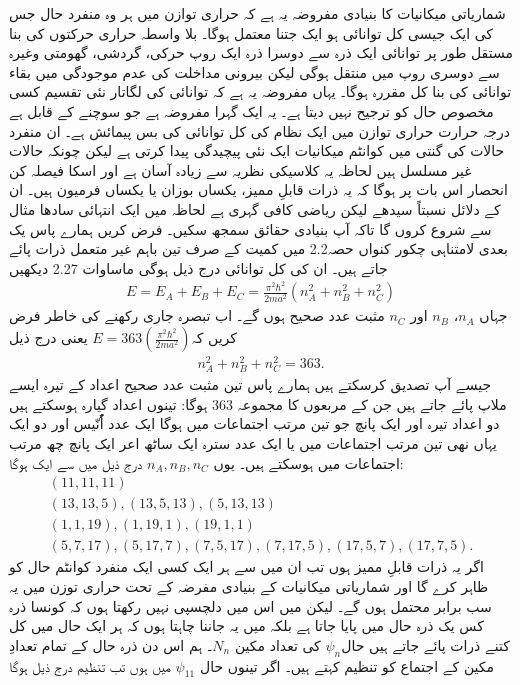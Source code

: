 شماریاتی میکانیات کا بنیادی مفروضہ یہ ہے کہ حراری توازن میں ہر وہ منفرد حال جس کی ایک جیسی کل توانائی  ہو ایک جتنا معتمل ہوگا۔ بلا واسطہ حراری حرکتوں کی بنا مستقل طور پر توانائی ایک ذرہ سے دوسرا ذرہ ایک روپ حرکی، گردشی، گھومتی وغیرہ سے دوسری روپ میں منتقل ہوگی لیکن بیرونی مداخلت کی عدم موجودگی میں بقاء توانائی کی بنا کل مقررہ ہوگا۔ یہاں مفروضہ یہ ہے  کہ توانائی کی لگاتار نئی تقسیم کسی مخصوص حال کو ترجیح نہیں دیتا ہے۔ یہ ایک گہرا مفروضہ ہے جو سوچنے کے قابل ہے درجہ حرارت  حراری توازن میں ایک نظام کی کل توانائی کی بس پیمائش ہے۔ ان منفرد حالات کی گنتی میں کوانٹم میکانیات ایک نئی پیچیدگی پیدا کرتی ہے لیکن چونکہ حالات غیر مسلسل ہیں لحاظہ یہ کلاسیکی نظریہ سے زیادہ آسان ہے اور اسکا فیصلہ کن انحصار اس بات پر ہوگا کہ یہ ذرات قابلِ ممیز، یکساں بوزان یا یکساں فرمیون ہیں۔ ان کے دلائل نسبتاً سیدھے لیکن ریاضی کافی گہری ہے لحاظہ میں ایک انتہائی سادھا مثال سے شروع کروں گا تاکہ آپ بنیادی حقائق سمجھ سکیں۔
فرض کریں ہمارے پاس یک بعدی لامتناہی چکور کنواں حصہ\num{2.2} میں کمیت  کے صرف تین باہم غیر متعمل ذرات پائے جاتے ہیں۔ ان کی کل توانائی درج ذیل ہوگی ماساوات \num{2.27} دیکھیں
\begin{align}
	E = E_A + E_B + E_C = \frac{\pi^2 \hbar ^2}{2ma^2}(n^2_A + n^2_B + n^2_C)
\end{align}
جہاں \(n_A\)، \(n_B\) اور \(n_C\) مثبت عدد صحیح ہوں گے۔ اب تبصرہ جاری رکھنے کی خاطر فرض کریں کہ\(E=363(\frac{\pi ^2 \hbar ^2}{2ma^2})\) یعنی درج ذیل
\begin{align}
	n^2_A + n^2_B + n^2_C = 363.
\end{align}  
جیسے آپ تصدیق کرسکتے ہیں ہمارے پاس تین مثبت عدد صحیح اعداد کے تیرہ ایسے ملاپ  پائے جاتے ہیں جن کے مربعوں کا مجموعہ \num{363} ہوگا: تینوں اعداد گیارہ ہوسکتے ہیں دو اعداد تیرہ  اور ایک پانچ جو تین مرتب اجتماعات میں ہوگا ایک عدد اُٗنّیس اور دو ایک یہاں نھی تین مرتب اجتماعات میں یا ایک عدد سترہ ایک ساٹھ اعر ایک پانچ چھ مرتب اجتماعات میں ہوسکتے ہیں۔ یوں \(n_A, n_B, n_C\)  درج ذیل میں سے ایک ہوگا:
\begin{align*}
	(11, 11, 11)\\
	(13, 13, 5), (13, 5, 13), (5, 13, 13)\\
	(1, 1, 19), (1, 19, 1), (19, 1, 1)\\
	(5, 7, 17), (5, 17, 7), (7, 5, 17), (7, 17, 5), (17, 5, 7), (17, 7, 5).
\end{align*}
اگر یہ ذرات قابلِ ممیز ہوں تب ان میں سے ہر ایک کسی ایک منفرد کوانٹم حال کو ظاہر کرے گا اور شماریاتی میکانیات کے بنیادی مفرضہ کے تحت حراری توزن میں یہ سب برابر محتمل ہوں گے۔ لیکن میں اس میں دلچسپی نہیں رکھتا ہوں کہ کونسا ذرہ کس یک ذرہ حال میں پایا جاتا ہے بلکہ میں یہ جاننا چاہتا ہوں کہ ہر ایک حال میں کل کتنے ذرات پائے جاتے ہیں حال\(\psi_n\) کی تعداد مکین \(N_n\)۔ ہم اس دن ذرہ حال کے تمام تعدادِ مکین کے اجتماع کو تنظیم کہتے ہیں۔ اگر تینوں حال \(\psi_{11}\)  میں ہوں تب تنظیم درج ذیل ہوگا
